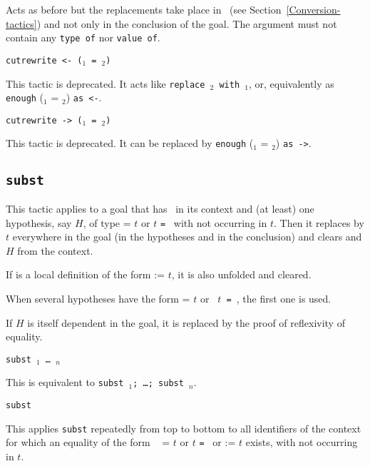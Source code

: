 \begin{coq_example*}
\begin{Variants}
    Acts as before but the replacements take place in
    ~(see Section~\ref{Conversion-tactics}) and not only
    in the conclusion of the goal.
    The  argument must not contain any \texttt{type of} nor \texttt{value of}.

\item {\tt cutrewrite <- (\term$_1$ = \term$_2$)}

This tactic is deprecated. It acts like {\tt replace {\term$_2$} with
  {\term$_1$}}, or, equivalently as {\tt enough} (\term$_1$ =
\term$_2$) {\tt as <-}.

\item {\tt cutrewrite -> (\term$_1$ = \term$_2$)}

This tactic is deprecated. It can be replaced by {\tt enough}
(\term$_1$ = \term$_2$) {\tt as ->}.

\end{Variants}

\subsection{\tt subst \ident}

This tactic applies to a goal that has \ident\ in its context and (at
least) one hypothesis, say $H$, of type {\tt \ident} = $t$ or $t$
{\tt = \ident} with {\ident} not occurring in $t$.  Then it replaces
{\ident} by $t$ everywhere in the goal (in the hypotheses and in the
conclusion) and clears {\ident} and $H$ from the context.

If {\ident} is a local definition of the form {\ident} := $t$, it is
also unfolded and cleared.

\Rem
When several hypotheses have the form {\tt \ident} = $t$ or {\tt
  $t$ = \ident}, the first one is used.

\Rem
If $H$ is itself dependent in the goal, it is replaced by the
proof of reflexivity of equality.

\begin{Variants}
  \item {\tt subst \ident$_1$ {\dots} \ident$_n$}

    This is equivalent to {\tt subst \ident$_1$; \dots; subst \ident$_n$}.
  \item {\tt subst}

    This applies {\tt subst} repeatedly from top to bottom to all
    identifiers of the context for which an equality of the form {\tt
      \ident} = $t$ or $t$ {\tt = \ident} or {\tt \ident} := $t$ exists, with
    {\ident} not occurring in $t$.


\end{Variants}
\end{coq_example*}
